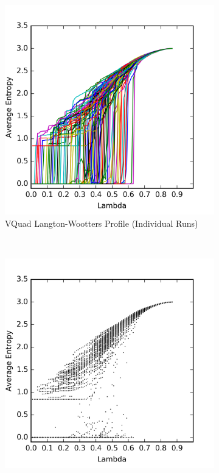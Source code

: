\documentclass[a4paper,11pt]{article}
\begin{document}
\begin{figure}[htp]
\centering
\begin{subfigure}[t]{0.45\textwidth}
  \includegraphics[width=\textwidth]{ch6_figs/vor_entropy}
  \caption{VQuad Langton-Wootters Profile (Individual Runs)}
  \label{fig:vor_lw_run}
\end{subfigure}
~
\begin{subfigure}[t]{0.45\textwidth}
  \centering
  \includegraphics[width=\textwidth]{ch6_figs/vor_entropy_scatter}

\end{subfigure}
\end{figure}
\end{document}

